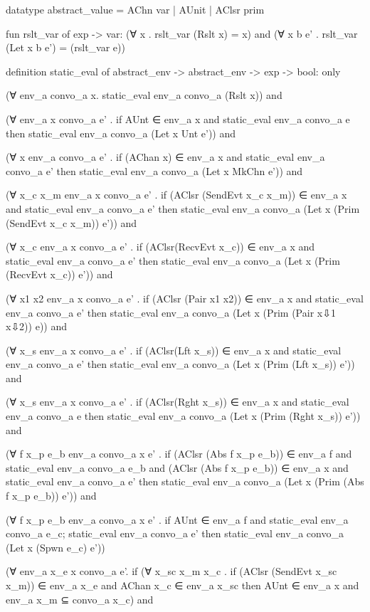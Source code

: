 datatype abstract_value =
  AChn var | AUnit | AClsr prim 

fun rslt_var of exp -> var:
(∀ x .
  rslt_var (Rslt x) = x) and
(∀ x b e' . 
  rslt_var (Let x b e') = (rslt_var e))


  
definition static_eval of abstract_env -> abstract_env -> exp -> bool:
only

(∀ env_a convo_a x.
    static_eval env_a convo_a (Rslt x)) and

(∀ env_a x convo_a e' .
  if 
    AUnt ∈ env_a x and
    static_eval env_a convo_a e
  then
    static_eval env_a convo_a (Let x Unt e')) and

(∀ x env_a convo_a e' .
  if 
    (AChan x) ∈ env_a x and
    static_eval env_a convo_a e'
  then  
    static_eval env_a convo_a (Let x MkChn e')) and

(∀ x_c x_m env_a x convo_a e' .
  if
    (AClsr (SendEvt x_c x_m)) ∈ env_a x and
    static_eval env_a convo_a e' 
  then
    static_eval env_a convo_a (Let x (Prim (SendEvt x_c x_m)) e')) and

(∀ x_c env_a x convo_a e' . 
  if 
    (AClsr(RecvEvt x_c)) ∈ env_a x and
    static_eval env_a convo_a e'
  then
    static_eval env_a convo_a (Let x (Prim (RecvEvt x_c)) e')) and

(∀ x1 x2 env_a x convo_a e' .
  if
    (AClsr (Pair x1 x2)) ∈ env_a x and
    static_eval env_a convo_a e'
  then
    static_eval env_a convo_a (Let x (Prim (Pair x⇩1 x⇩2)) e)) and

(∀ x_s env_a x convo_a e' .
  if
    (AClsr(Lft x_s)) ∈ env_a x and
    static_eval env_a convo_a e' 
  then
    static_eval env_a convo_a (Let x (Prim (Lft x_s)) e')) and

(∀ x_s env_a x convo_a e' .
  if
    (AClsr(Rght x_s)) ∈ env_a x and
    static_eval env_a convo_a e
  then
    static_eval env_a convo_a (Let x (Prim (Rght x_s)) e')) and

(∀ f x_p e_b env_a convo_a x e' .
  if
    (AClsr (Abs f x_p e_b)) ∈ env_a f and
    static_eval env_a convo_a e_b and
    (AClsr (Abs f x_p e_b)) ∈ env_a x and
    static_eval env_a convo_a e'
  then
    static_eval env_a convo_a (Let x (Prim (Abs f x_p e_b)) e')) and

(∀ f x_p e_b env_a convo_a x e' .
  if
    AUnt ∈ env_a f and
    static_eval env_a convo_a e_c;
    static_eval env_a convo_a e'
  then
    static_eval env_a convo_a (Let x (Spwn e_c) e'))

(∀ env_a x_e x convo_a  e'.
  if
    (∀ x_sc x_m x_c . 
      if
        (AClsr (SendEvt x_sc x_m)) ∈ env_a x_e and 
        AChan x_c ∈ env_a x_sc 
      then
        AUnt ∈ env_a x and env_a x_m ⊆ convo_a x_c) and


